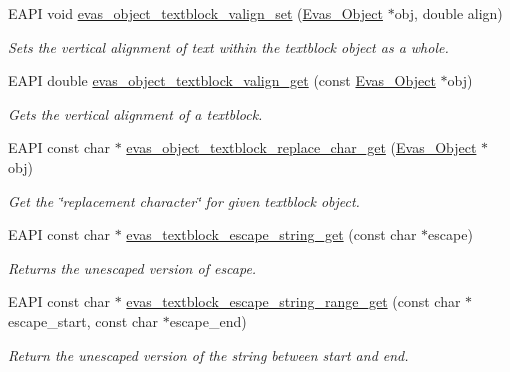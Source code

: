 \begin{DoxyCompactItemize}
EAPI void \hyperlink{group__Evas__Object__Textblock_ga5f08b5b6222ed341574ec8167a86c9a0}{evas\_\-object\_\-textblock\_\-valign\_\-set} (\hyperlink{group__Evas__Object__Group_ga9e19e6dd1f517a0ba437c0114d3e7c97}{Evas\_\-Object} $\ast$obj, double align)
\begin{DoxyCompactList}\small\item\em Sets the vertical alignment of text within the textblock object as a whole. \item\end{DoxyCompactList}\item 
EAPI double \hyperlink{group__Evas__Object__Textblock_ga431ec30179fc3d7bcd98f508453e41bb}{evas\_\-object\_\-textblock\_\-valign\_\-get} (const \hyperlink{group__Evas__Object__Group_ga9e19e6dd1f517a0ba437c0114d3e7c97}{Evas\_\-Object} $\ast$obj)
\begin{DoxyCompactList}\small\item\em Gets the vertical alignment of a textblock. \item\end{DoxyCompactList}\item 
EAPI const char $\ast$ \hyperlink{group__Evas__Object__Textblock_ga61f6c6ea8c0ce2028424396eb2ff4a81}{evas\_\-object\_\-textblock\_\-replace\_\-char\_\-get} (\hyperlink{group__Evas__Object__Group_ga9e19e6dd1f517a0ba437c0114d3e7c97}{Evas\_\-Object} $\ast$obj)
\begin{DoxyCompactList}\small\item\em Get the \char`\"{}replacement character\char`\"{} for given textblock object. \item\end{DoxyCompactList}\item 
EAPI const char $\ast$ \hyperlink{group__Evas__Object__Textblock_gac165d57003e552fa6739158dc2ed73f5}{evas\_\-textblock\_\-escape\_\-string\_\-get} (const char $\ast$escape)
\begin{DoxyCompactList}\small\item\em Returns the unescaped version of escape. \item\end{DoxyCompactList}\item 
EAPI const char $\ast$ \hyperlink{group__Evas__Object__Textblock_ga57940db29ffb910af130dd2100e48ff2}{evas\_\-textblock\_\-escape\_\-string\_\-range\_\-get} (const char $\ast$escape\_\-start, const char $\ast$escape\_\-end)
\begin{DoxyCompactList}\small\item\em Return the unescaped version of the string between start and end. \item\end{DoxyCompactList}\item 

\end{DoxyCompactItemize}
